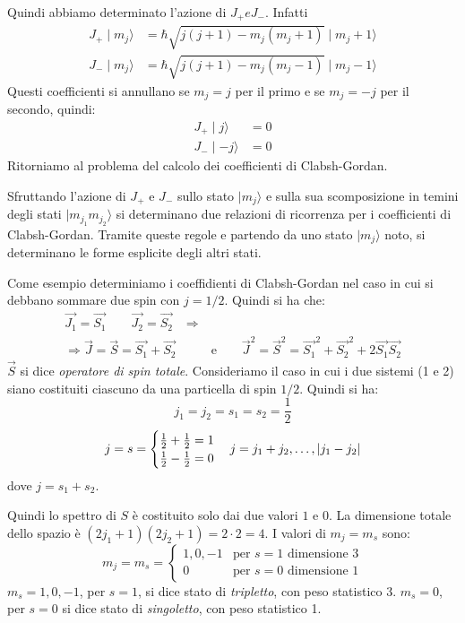 Quindi abbiamo determinato l'azione di $J_{+} e J_{-}$. Infatti
\begin{align}
J_{+} \mid m_{j} \rangle &= \hbar \sqrt{j\left(j+1\right) - m_{j}\left(m_{j} 
+1\right)} \mid m_{j} +1 \rangle \\
J_{-} \mid m_{j}\rangle &= \hbar \sqrt{j\left(j+1\right) - m_{j}\left(m_{j} 
-1\right)} \mid m_{j} -1 \rangle
\end{align}
Questi coefficienti si annullano se $m_{j} = j$ per il primo e se $m_{j} =-j$
per il secondo, quindi:
\begin{align}
J_{+}\mid j\rangle &= 0 \\
J_{-}\mid -j\rangle &= 0
\end{align}
Ritorniamo al problema del calcolo dei coefficienti di Clabsh-Gordan.

Sfruttando l'azione di $J_{+}$ e $J_{-}$ sullo stato $\mid m_{j}\rangle$ e sulla
sua scomposizione in temini degli stati $\mid m_{j_{1}} m_{j_{2}} \rangle$ si
determinano due relazioni di ricorrenza per i coefficienti di Clabsh-Gordan.
Tramite queste regole e partendo da uno stato $\mid m_{j} \rangle$ noto, si
determinano le forme esplicite degli altri stati.

Come esempio determiniamo i coeffidienti di Clabsh-Gordan nel caso in cui si
debbano sommare due spin con $j=1/2$. Quindi si ha che:
\begin{equation}
\begin{split}
\vec{J_{1}} =\vec{S_{1}} \quad \quad \vec{J_{2}} =\vec{S_{2}} & \Rightarrow \\
\Rightarrow \vec{J} = \vec{S} = \vec{S_{1}} + \vec{S_{2}} & \quad \quad 
\text{e} \quad \quad \vec{J}^{2} = \vec{S}^{2} = \vec{S_{1}}^{2} + 
\vec{S_{2}}^{2} + 2\vec{S_{1}}\vec{S_{2}}
\end{split}
\end{equation}
$\vec{S}$ si dice \textit{operatore di spin totale}. Consideriamo il caso in cui
i due sistemi (1 e 2) siano costituiti ciascuno da una particella di spin $1/2$.
Quindi si ha:
\begin{equation}
j_{1} = j_{2} = s_{1} = s_{2} = \dfrac{1}{2}
\end{equation}
\[
j = s =
\begin{cases}
\frac{1}{2} + \frac{1}{2} = 1 \\
\frac{1}{2} - \frac{1}{2} = 0
\end{cases}
j = j_{1} + j_{2}, \dots, \left| j_{1} - j_{2} \right|
\]
dove $j = s_{1} + s_{2}$.

Quindi lo spettro di $S$ è costituito solo dai due valori $1$ e $0$. La
dimensione totale dello spazio è $\left(2j_{1} +1\right)\left(2j_{2} +1 \right)
= 2 \cdot 2 = 4$. I valori di $m_{j} = m_{s}$ sono:
\[
m_{j} = m_{s} = 
\begin{cases}
1, 0, -1 & \text{per $s=1$ \ dimensione 3} \\
0 & \text{per $s=0$ \ dimensione 1}
\end{cases}
\]
$m_{s}= 1,0,-1$, per $s=1$, si dice stato di \textit{tripletto}, con peso
statistico 3. $m_{s} = 0$, per $s=0$ si dice stato di \textit{singoletto}, con
peso statistico 1.

